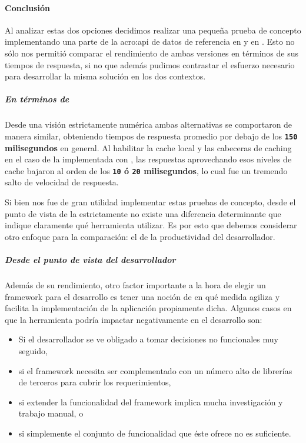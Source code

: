 \paragraph{Conclusión}
\label{soa:tecnologias:apps:conclusion}

Al analizar estas dos opciones decidimos realizar una pequeña prueba de concepto implementando una parte de la \gls{acro:api} de datos de referencia en  y en . Esto no sólo nos permitió comparar el rendimiento de ambas versiones en términos de sus tiempos de respuesta, si no que además pudimos contrastar el esfuerzo necesario para desarrollar la misma solución en los dos contextos.

\subparagraph{En términos de }

Desde una visión estrictamente numérica ambas alternativas se comportaron de manera similar, obteniendo tiempos de respuesta promedio por debajo de los \textbf{\texttt{150} milisegundos} en general. Al habilitar la cache local y las cabeceras de caching en el caso de la implementada con , las respuestas aprovechando esos niveles de cache bajaron al orden de los \textbf{\texttt{10} ó \texttt{20} milisegundos}, lo cual fue un tremendo salto de velocidad de respuesta.

Si bien nos fue de gran utilidad implementar estas pruebas de concepto, desde el punto de vista de la  estrictamente no existe una diferencia determinante que indique claramente qué herramienta utilizar. Es por esto que debemos considerar otro enfoque para la comparación: el de la productividad del desarrollador.

\subparagraph{Desde el punto de vista del desarrollador}

Además de su rendimiento, otro factor importante a la hora de elegir un framework para el desarrollo es tener una noción de en qué medida agiliza y facilita la implementación de la aplicación propiamente dicha. Algunos casos en que la herramienta podría impactar negativamente en el desarrollo son:

\begin{itemize}
  \item Si el desarrollador se ve obligado a tomar decisiones no funcionales muy seguido,
  \item si el framework necesita ser complementado con un número alto de librerías de terceros para cubrir los requerimientos,
  \item si extender la funcionalidad del framework implica mucha investigación y trabajo manual, o
  \item si simplemente el conjunto de funcionalidad que éste ofrece no es suficiente.
\end{itemize}

